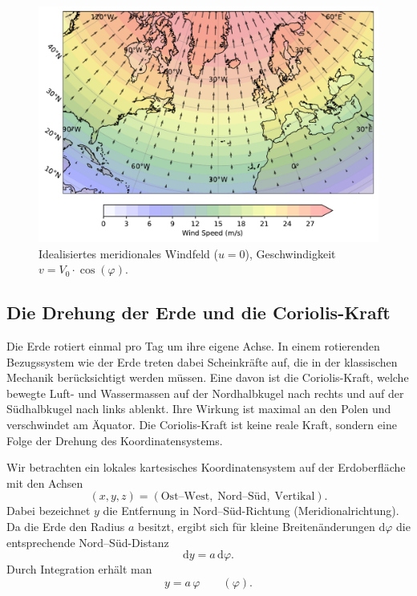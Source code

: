 \begin{figure}
	\centering
	\includegraphics[width=\textwidth, trim=1cm 0cm 2cm 0cm, clip]{papers/rossby/images/meridional_wind_plot.pdf}
	\caption{Idealisiertes meridionales Windfeld (\(u=0\)), Geschwindigkeit \(v = V_0 \cdot \cos(\varphi)\).}
	\label{fig:meridional_wind}
\end{figure}

\subsection{Die Drehung der Erde und die Coriolis-Kraft}

Die Erde rotiert einmal pro Tag um ihre eigene Achse. In einem rotierenden
Bezugssystem wie der Erde treten dabei Scheinkräfte auf, die in der klassischen
Mechanik berücksichtigt werden müssen. Eine davon ist die {Coriolis-Kraft},
welche bewegte Luft- und Wassermassen auf der {Nordhalbkugel} nach rechts und
auf der {Südhalbkugel} nach links ablenkt. Ihre Wirkung ist maximal an den
Polen und verschwindet am Äquator. Die Coriolis-Kraft ist keine reale Kraft,
sondern eine Folge der Drehung des Koordinatensystems.

Wir betrachten ein lokales kartesisches Koordinatensystem auf der Erdoberfläche mit den Achsen
\begin{equation}
(x,y,z) = (\text{Ost–West}, \; \text{Nord–Süd}, \; \text{Vertikal}).
\end{equation}
Dabei bezeichnet \(y\) die Entfernung in Nord–Süd-Richtung (Meridionalrichtung). 
Da die Erde den Radius \(a\) besitzt, ergibt sich für kleine Breitenänderungen \(\mathrm{d}\varphi\) die entsprechende Nord–Süd-Distanz
\begin{equation}
\mathrm{d}y = a \, \mathrm{d}\varphi.
\end{equation}
Durch Integration erhält man
\begin{equation}
y = a \, \varphi \qquad (\varphi ).
\end{equation}

